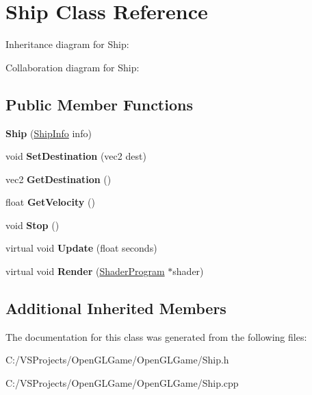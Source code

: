 \hypertarget{class_ship}{\section{Ship Class Reference}
\label{class_ship}
}


Inheritance diagram for Ship\-:


Collaboration diagram for Ship\-:
\subsection*{Public Member Functions}
\begin{DoxyCompactItemize}
\item 
\hypertarget{class_ship_a0eed9d85d8dbdd635a612c80302f4a71}{{\bfseries Ship} (\hyperlink{struct_ship_info}{Ship\-Info} info)}\label{class_ship_a0eed9d85d8dbdd635a612c80302f4a71}

\item 
\hypertarget{class_ship_a6b55203b30d1f9c853c287b0e7d020ca}{void {\bfseries Set\-Destination} (vec2 dest)}\label{class_ship_a6b55203b30d1f9c853c287b0e7d020ca}

\item 
\hypertarget{class_ship_a384c6bc59cbc653ac2f63f102db54609}{vec2 {\bfseries Get\-Destination} ()}\label{class_ship_a384c6bc59cbc653ac2f63f102db54609}

\item 
\hypertarget{class_ship_a4325d7bf438c622e78c0a2c582ea776b}{float {\bfseries Get\-Velocity} ()}\label{class_ship_a4325d7bf438c622e78c0a2c582ea776b}

\item 
\hypertarget{class_ship_aafeb4b8ce879b45f9701bb6240d83202}{void {\bfseries Stop} ()}\label{class_ship_aafeb4b8ce879b45f9701bb6240d83202}

\item 
\hypertarget{class_ship_a85cef0f2634244a4108f2de8926c079b}{virtual void {\bfseries Update} (float seconds)}\label{class_ship_a85cef0f2634244a4108f2de8926c079b}

\item 
\hypertarget{class_ship_a2811429a2dd337245d4fda333e872f24}{virtual void {\bfseries Render} (\hyperlink{class_shader_program}{Shader\-Program} $\ast$shader)}\label{class_ship_a2811429a2dd337245d4fda333e872f24}

\end{DoxyCompactItemize}
\subsection*{Additional Inherited Members}


The documentation for this class was generated from the following files\-:\begin{DoxyCompactItemize}
\item 
C\-:/\-V\-S\-Projects/\-Open\-G\-L\-Game/\-Open\-G\-L\-Game/Ship.\-h\item 
C\-:/\-V\-S\-Projects/\-Open\-G\-L\-Game/\-Open\-G\-L\-Game/Ship.\-cpp\end{DoxyCompactItemize}
